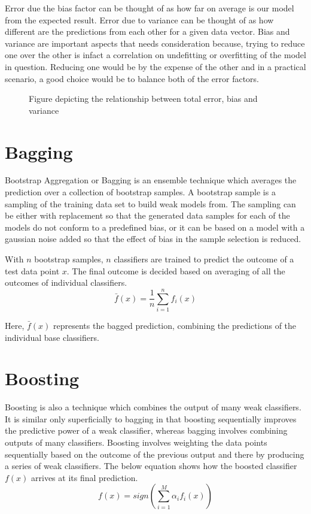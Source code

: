 \documentclass{acmtog} %
\begin{document}
Error due the bias factor can be thought of as how far on average is our model from the expected result. Error due to variance can be thought of as how different are the predictions from each other for a given data vector. Bias and variance are important aspects that needs consideration because, trying to reduce one over the other is infact a correlation on undefitting or overfitting of the model in question. Reducing one would be by the expense of the other and in a practical scenario, a good choice would be to balance both of the error factors. 
\begin{figure}
	\centering
	\def\svgwidth{\columnwidth}
	
	\caption{Figure depicting the relationship between total error, bias and variance}
\end{figure}
\section{Bagging}
Bootstrap Aggregation or Bagging is an ensemble technique which averages the prediction over a collection of bootstrap samples. A bootstrap sample is a sampling of the training data set to build weak models from. The sampling can be either with replacement so that the generated data samples for each of the models do not conform to a predefined bias, or it can be based on a model with a gaussian noise added so that the effect of bias in the sample selection is reduced.

With $n$ bootstrap samples, $n$ classifiers are trained to predict the outcome of a test data point $x$. The final outcome is decided based on averaging of all the outcomes of individual classifiers.
\begin{equation}
	\bar{f}(x) = \frac{1}{n}\sum^n_{i=1} f_i(x)
\label{eq:baggingEq}
\end{equation}

Here, $\bar{f}(x)$ represents the bagged prediction, combining the predictions of the individual base classifiers.

\section{Boosting}
Boosting is also a technique which combines the output of many weak classifiers. It is similar only superficially to bagging in that boosting sequentially improves the predictive power of a weak classifier, whereas bagging involves combining outputs of many classifiers. Boosting involves weighting the data points sequentially based on the outcome of the previous output and there by producing a series of weak classifiers.
The below equation shows how the boosted classifier $f(x)$ arrives at its final prediction.
\begin{equation}
	f(x) = sign(\sum^M_{i=1} \alpha _i f_i(x))
\label{eq:boostingEq}
\end{equation}
\end{document}
